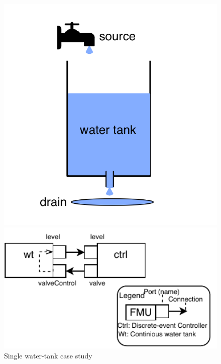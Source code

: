 \documentclass[runningheads]{llncs}
\begin{document}
\begin{figure}[H]
    \centering
    \begin{minipage}{0.35\textwidth}
        \centering
    \includegraphics[width=1\textwidth]{images/singletank.png}
    \end{minipage}\hfill
    \begin{minipage}{0.55\textwidth}
        \centering
    \includegraphics[width=1\textwidth]{images/waterTankFMU-Page-1.pdf}
    \end{minipage}
    \caption{Single water-tank case study}
    \label{fig:watertank}
\end{figure}
\end{document}
